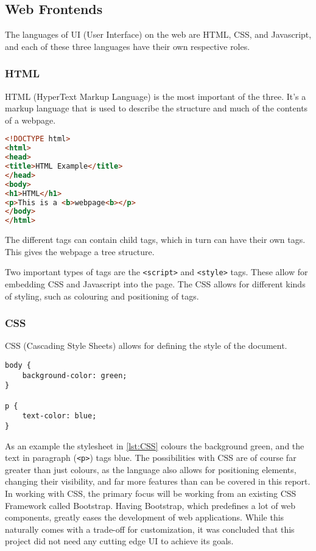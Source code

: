 \subsection{Web Frontends} \label{sec:webfrontends}
The languages of UI (User Interface) on the web are HTML, CSS, and Javascript, and each of these three languages have their own respective roles.\cite{nixonweb}

\subsubsection*{HTML}

HTML (HyperText Markup Language) is the most important of the three.
It's a markup language that is used to describe the structure and much of the contents of a webpage.
\begin{lstlisting}[language=HTML,caption={\color{red}indsæt caption tekst},label=lst:HTML]
<!DOCTYPE html>
<html>
<head>
<title>HTML Example</title>
</head>
<body>
<h1>HTML</h1>
<p>This is a <b>webpage<b></p>
</body>
</html>
\end{lstlisting}
The different tags can contain child tags, which in turn can have their own tags.
This gives the webpage a tree structure.

Two important types of tags are the \texttt{<script>} and \texttt{<style>} tags.
These allow for embedding CSS and Javascript into the page.
The CSS allows for different kinds of styling, such as colouring and positioning of tags.

\subsubsection*{CSS}

CSS (Cascading Style Sheets) allows for defining the style of the document.
\begin{lstlisting}[caption={\color{red}indsæt caption tekst},label=lst:CSS]
body {
	background-color: green;
}

p {
	text-color: blue;
}
\end{lstlisting}
As an example the stylesheet in \cref{lst:CSS} colours the background green, and the text in paragraph (\texttt{<p>}) tags blue.
The possibilities with CSS are of course far greater than just colours, as the language also allows for positioning elements, changing their visibility, and far more features than can be covered in this report.\cite{nixonweb}
In working with CSS, the primary focus will be working from an existing CSS Framework called Bootstrap.
Having Bootstrap, which predefines a lot of web components, greatly eases the development of web applications.
While this naturally comes with a trade-off for customization, it was concluded that this project did not need any cutting edge UI to achieve its goals.

